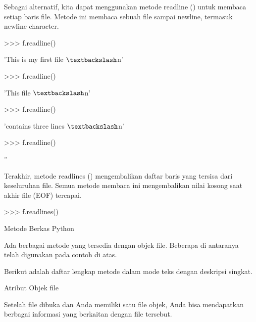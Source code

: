 \vspace{12pt}
\noindent 
Sebagai alternatif, kita dapat menggunakan metode readline () untuk membaca setiap baris file. Metode ini membaca sebuah file sampai newline, termasuk newline character. \par
\vspace{12pt}
\noindent 
>>> f.readline() \par
\noindent 
'This is my first file $  \textbackslash  $n' \par
\vspace{12pt}
\noindent 
>>> f.readline() \par
\noindent 
'This file $  \textbackslash  $n' \par
\vspace{12pt}
\noindent 
>>> f.readline() \par
\noindent 
'contains three lines $  \textbackslash  $n' \par
\vspace{12pt}
\noindent 
>>> f.readline() \par
\noindent 
'' \par
\vspace{16pt}
\noindent 
Terakhir, metode readlines () mengembalikan daftar baris yang tersisa dari keseluruhan file. Semua metode membaca ini mengembalikan nilai kosong saat akhir file (EOF) tercapai. \par
\vspace{12pt}
\noindent 
>>> f.readlines() \par
{} \par
\vspace{12pt}
\vspace{12pt}
\noindent 
Metode Berkas Python \par
\vspace{12pt}
\noindent 
Ada berbagai metode yang tersedia dengan objek file. Beberapa di antaranya telah digunakan pada contoh di atas. \par
\vspace{12pt}
\noindent 
Berikut adalah daftar lengkap metode dalam mode teks dengan deskripsi singkat. \par
\vspace{12pt}
\noindent 
Atribut Objek file \par
\vspace{12pt}
\noindent 
Setelah file dibuka dan Anda memiliki satu file objek, Anda bisa mendapatkan berbagai informasi yang berkaitan dengan file tersebut. \par
